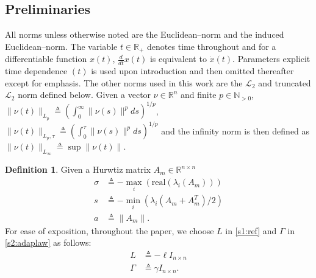\documentclass[10pt,journal]{IEEEtran}
\theoremstyle{plain}%
\theoremstyle{definition}
\newtheorem{defn}{Definition}%
\newcommand{\be}[0]{\begin{equation}}
\newcommand{\ee}[0]{\end{equation}}
\newcommand{\ben}[0]{\begin{equation*}}
\newcommand{\een}[0]{\end{equation*}}
\newcommand{\norms}[1]{\lVert#1\rVert}
\newcommand{\normB}[0]{\norms}
\let\norm=\normB
\renewcommand{\Re}[0]{\mathbb R}
\newcommand{\norml}[2]{\norm{#1}_{L_{#2}}}
\begin{document}
%

\subsection{Preliminaries}
All norms unless otherwise noted are the Euclidean--norm and the induced Euclidean--norm. The variable $t\in \Re_+$ denotes time throughout and for a differentiable function $x(t)$, $\frac{d}{dt} x(t)$ is equivalent to $\dot x(t)$. Parameters explicit time dependence $(t)$ is used upon introduction and then omitted thereafter except for emphasis. The other norms used in this work are the $\mathcal L_2$ and truncated $\mathcal L_2$ norm defined below. Given a vector $\nu \in \Re^n$ and finite $p \in\mathbb N_{>0}$, $
\norm {\nu(t)}_{L_p}    \triangleq  \left(  \int_0^\infty \norm {\nu(s)} ^p ds\right)^{1/p}$, $\norm {\nu(t)}_{L_p,\tau}  \triangleq   \left( \int_0^\tau \norm {\nu(s)} ^p ds\right)^{1/p}$ and the infinity norm is then defined as $\norml{\nu(t)}{\infty} \triangleq \sup \norm{\nu(t)}$.

\begin{defn} Given a Hurwtiz matrix $A_m\in \Re^{n\times n}$
\be
\begin{split}
\label{s1:ambound}
 \sigma& \triangleq - \max_i  \left( \text{real} (\lambda_i(A_m))  \right) \\
  s& \triangleq - \min_i  \left( \lambda_i\left(A_m+A_m^T\right)/2  \right) \\
 	  a& \triangleq \norm{A_m}. 
\end{split}
\ee 
 For ease of exposition, throughout the paper, we choose $L$ in  \eqref{s1:ref} and $\Gamma$ in \eqref{s2:adaplaw} as follows:
\begin{align}\label{s1:L} L &\triangleq  -\ell I_{n \times n} \\
\label{s1:G}\Gamma & \triangleq \gamma I_{n\times n}.
\end{align}
\end{defn}
\end{document}
